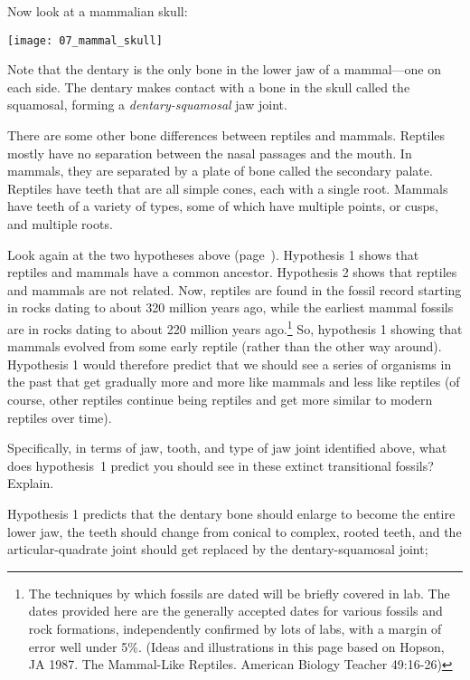 \documentclass[12pt, hidelinks]{exam}
\newcommand*\AnswerBox[2]{%
    \parbox[t][#1]{0.92\textwidth}{%
    \begin{solution}#2\end{solution}}
}
\begin{document}
\begin{questions}
Now look at a mammalian skull:

	\begin{center}\texttt{[image: 07\_mammal\_skull]} \end{center}
	
Note that the dentary is the only bone in the lower jaw of a mammal—one on each side.  The dentary makes contact with a bone in the skull called the squamosal, forming a \emph{dentary-squamosal} jaw joint. 

There are some other bone differences between reptiles and mammals.  Reptiles mostly have no separation between the nasal passages and the mouth.  In mammals, they are separated by a plate of bone called the secondary palate.  Reptiles have teeth that are all simple cones, each with a single root.  Mammals have teeth of a variety of types, some of which have multiple points, or cusps, and multiple roots.  

Look again at the two hypotheses above (page~\pageref{hypothesis1}). Hypothesis 1 shows that reptiles and mammals have a common ancestor. Hypothesis 2 shows that reptiles and mammals are not related.  Now, reptiles are found in the fossil record starting in rocks dating to about 320 million years ago, while the earliest mammal fossils are in rocks dating to about 220 million years ago.\footnote{The techniques by which fossils are dated will be briefly covered in lab.  The dates provided here are the generally accepted dates for various fossils and rock formations, independently confirmed by lots of labs, with a margin of error well under 5\%.  (Ideas and illustrations in this page based on Hopson, JA 1987.  The Mammal-Like Reptiles.  American Biology Teacher 49:16-26)}  So, hypothesis 1 showing that mammals evolved from some early reptile (rather than the other way around). Hypothesis 1 would therefore predict that we should see a series of organisms in the past that get gradually more and more like mammals and less like reptiles (of course, other reptiles continue being reptiles and get more similar to modern reptiles over time).  

\question
Specifically, in terms of jaw, tooth, and type of jaw joint identified above, what does hypothesis~1 predict you should see in these extinct transitional fossils?  Explain.

\AnswerBox{8\baselineskip}{%
Hypothesis 1 predicts that the dentary bone should enlarge to become the entire lower jaw, the teeth should change from conical to complex, rooted teeth, and the articular-quadrate joint should get replaced by the dentary-squamosal joint; 
}



\end{questions}
\end{document}
